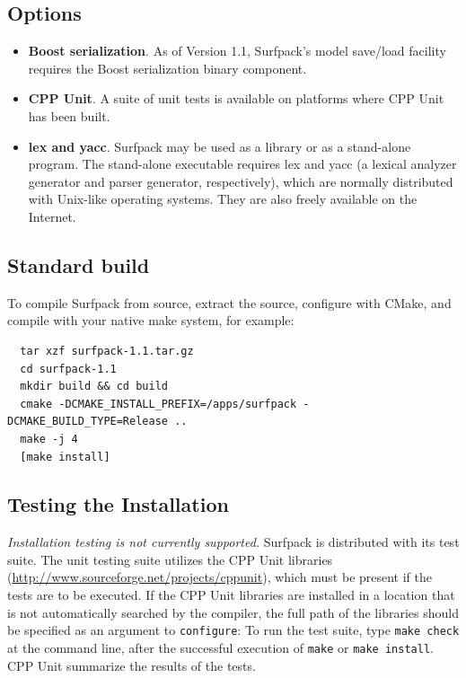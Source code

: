 \documentclass{article}
\begin{document}
\subsection{Options}
\begin{itemize}
\item {\bf Boost serialization}.  As of Version 1.1, Surfpack's model save/load facility requires the Boost serialization binary component.
\item {\bf CPP Unit}.  A suite of unit tests is available on platforms where CPP Unit has been built.
\item {\bf lex and yacc}. Surfpack may be used as a library or as a stand-alone program.  The stand-alone executable requires lex and yacc (a lexical analyzer generator and parser generator, respectively), which are normally distributed with Unix-like operating systems.  They are also freely available on the Internet.
\end{itemize}

\subsection{Standard build}
To compile Surfpack from source, extract the source, configure with
CMake, and compile with your native make system, for example:
\begin{verbatim}
  tar xzf surfpack-1.1.tar.gz
  cd surfpack-1.1
  mkdir build && cd build
  cmake -DCMAKE_INSTALL_PREFIX=/apps/surfpack -DCMAKE_BUILD_TYPE=Release ..
  make -j 4
  [make install]
\end{verbatim}

\subsection{Testing the Installation}
\textit{Installation testing is not currently supported.}  Surfpack is
distributed with its test suite.  The unit testing suite utilizes the
CPP Unit libraries
(\url{http://www.sourceforge.net/projects/cppunit}), which must be
present if the tests are to be executed.  If the CPP Unit libraries
are installed in a location that is not automatically searched by the
compiler, the full path of the libraries should be specified as an
argument to \texttt{configure}:
 To run the
test suite, type \texttt{make check} at the command line, after the
successful execution of \texttt{make} or \texttt{make install}.  CPP
Unit summarize the results of the tests.
\end{document}
